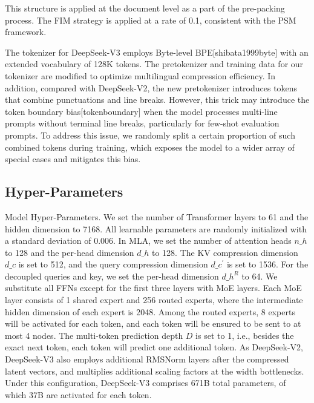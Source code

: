 \documentclass[11pt,a4paper]{article}
\begin{document}
This structure is applied at the document level as a part of the pre-packing process. 
The FIM strategy is applied at a rate of 0.1, consistent with the PSM framework.

The tokenizer for DeepSeek-V3 employs Byte-level BPE[shibata1999byte] with an extended vocabulary of 128K tokens. 
The pretokenizer and training data for our tokenizer are modified to optimize multilingual compression efficiency. 
In addition, compared with DeepSeek-V2, the new pretokenizer introduces tokens that combine punctuations and line breaks. 
However, this trick may introduce the token boundary bias[tokenboundary] when the model processes multi-line prompts without terminal line breaks, particularly for few-shot evaluation prompts. 
To address this issue, we randomly split a certain proportion of such combined tokens during training, which exposes the model to a wider array of special cases and mitigates this bias.

\subsection{Hyper-Parameters}

Model Hyper-Parameters.
We set the number of Transformer layers to 61 and the hidden dimension to 7168. 
All learnable parameters are randomly initialized with a standard deviation of 0.006.
In MLA, we set the number of attention heads $n\_h$ to 128 and the per-head dimension $d\_h$ to 128. 
The KV compression dimension $d\_c$ is set to 512, and the query compression dimension $d\_c^{\prime}$ is set to 1536. 
For the decoupled queries and key, we set the per-head dimension $d\_h^R$ to 64. 
We substitute all FFNs except for the first three layers with MoE layers. 
Each MoE layer consists of 1 shared expert and 256 routed experts, where the intermediate hidden dimension of each expert is 2048. 
Among the routed experts, 8 experts will be activated for each token, and each token will be ensured to be sent to at most 4 nodes. 
The multi-token prediction depth $D$ is set to 1, i.e., besides the exact next token, each token will predict one additional token. 
As DeepSeek-V2, DeepSeek-V3 also employs additional RMSNorm layers after the compressed latent vectors, and multiplies additional scaling factors at the width bottlenecks. 
Under this configuration, DeepSeek-V3 comprises 671B total parameters, of which 37B are activated for each token.
\end{document}
